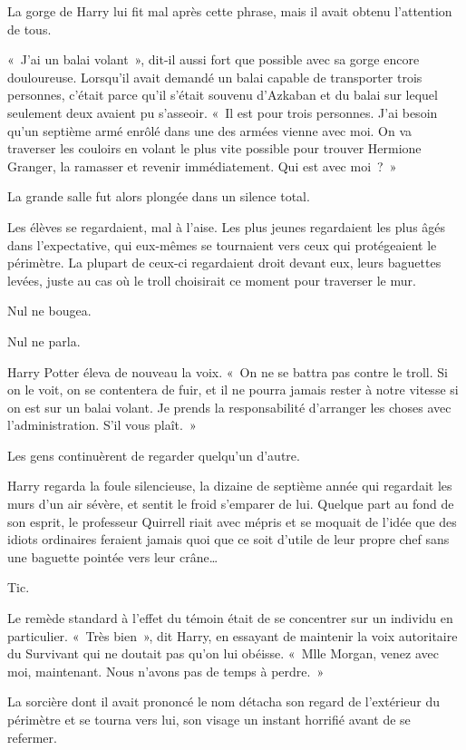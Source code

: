 La gorge de Harry lui fit mal après cette phrase, mais il avait obtenu l'attention de tous.

«~J'ai un balai volant~», dit-il aussi fort que possible avec sa gorge encore douloureuse.
Lorsqu'il avait demandé un balai capable de transporter trois personnes, c'était parce qu'il s'était souvenu d'Azkaban et du balai sur lequel seulement deux avaient pu s'asseoir.
«~Il est pour trois personnes.
J'ai besoin qu'un septième armé enrôlé dans une des armées vienne avec moi.
On va traverser les couloirs en volant le plus vite possible pour trouver Hermione Granger, la ramasser et revenir immédiatement.
Qui est avec moi~?~»

La grande salle fut alors plongée dans un silence total.

Les élèves se regardaient, mal à l'aise.
Les plus jeunes regardaient les plus âgés dans l'expectative, qui eux-mêmes se tournaient vers ceux qui protégeaient le périmètre.
La plupart de ceux-ci regardaient droit devant eux, leurs baguettes levées, juste au cas où le troll choisirait ce moment pour traverser le mur.

Nul ne bougea.

Nul ne parla.

Harry Potter éleva de nouveau la voix.
«~On ne se battra pas contre le troll.
Si on le voit, on se contentera de fuir, et il ne pourra jamais rester à notre vitesse si on est sur un balai volant.
Je prends la responsabilité d'arranger les choses avec l'administration.
S'il vous plaît.~»

Les gens continuèrent de regarder quelqu'un d'autre.

Harry regarda la foule silencieuse, la dizaine de septième année qui regardait les murs d'un air sévère, et sentit le froid s'emparer de lui.
Quelque part au fond de son esprit, le professeur Quirrell riait avec mépris et se moquait de l'idée que des idiots ordinaires feraient jamais quoi que ce soit d'utile de leur propre chef sans une baguette pointée vers leur crâne…

Tic.

Le remède standard à l'effet du témoin était de se concentrer sur un individu en particulier.
«~Très bien~», dit Harry, en essayant de maintenir la voix autoritaire du Survivant qui ne doutait pas qu'on lui obéisse.
«~Mlle Morgan, venez avec moi, maintenant.
Nous n'avons pas de temps à perdre.~»

La sorcière dont il avait prononcé le nom détacha son regard de l'extérieur du périmètre et se tourna vers lui, son visage un instant horrifié avant de se refermer.

